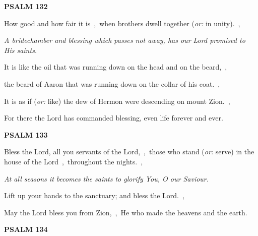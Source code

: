 \documentclass[12pt,twoside,a5paper]{article}
\newcommand{\psalm}[1]{\textbf{PSALM {#1}}\nopagebreak}
\newcommand{\qanona}[1]{{\liturgicalhint{Qanona.} \emph{#1}}}
\newcommand{\translationoption}[1]{\emph{or:} #1}
\begin{document}
\psalm{132}

\begin{normalparskip}
  How good and how fair it is~\sep\ when brothers dwell together (\translationoption{in unity}).~\sep

  \qanona{A bridechamber and blessing which passes not away, has our Lord promised to His saints.}

  It is like the oil that was running down on the head and on the beard,~\sep

  the beard of Aaron that was running down on the collar of his coat.~\sep

  It is as if (\translationoption{like}) the dew of Hermon were descending on mount Zion.~\sep

  For there the Lord has commanded blessing, even life forever and ever.
\end{normalparskip}

\psalm{133}

\begin{normalparskip}
  Bless the Lord, all you servants of the Lord,~\sep\ those who stand (\translationoption{serve}) in the house of the Lord~\sep\ throughout the nights.~\sep

  \qanona{At all seasons it becomes the saints to glorify You, O our Saviour.}

  Lift up your hands to the sanctuary; and bless the Lord.~\sep

  May the Lord bless you from Zion,~\sep\ He who made the heavens and the earth.
\end{normalparskip}

\psalm{134}
\end{document}
